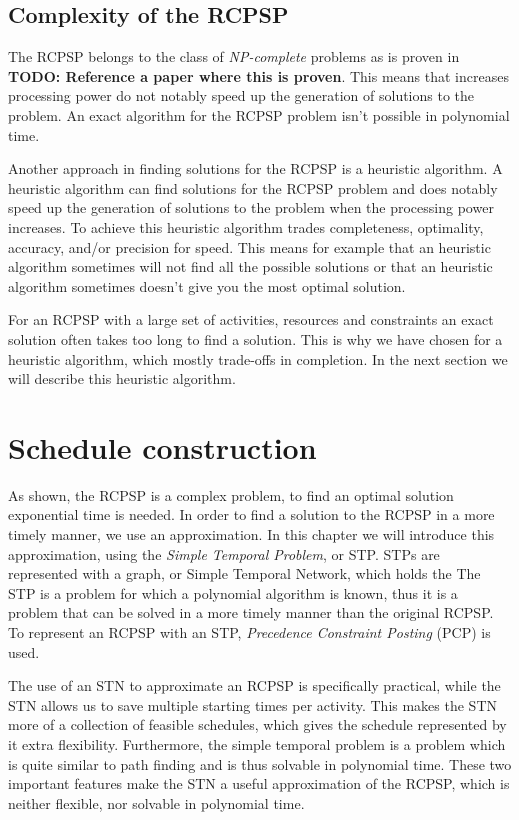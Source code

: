 \documentclass{article}
\theoremstyle{definition}
\newcommand{\TODO}[1]{{\color{red}\textbf{TODO: #1}}}
\begin{document}
\subsection{Complexity of the RCPSP}
\label{text:complex}
The RCPSP belongs to the class of \emph{NP-complete} problems as is proven in \TODO{Reference a paper where this is proven}.
This means that increases processing power do not notably speed up the generation of solutions to the problem.
An exact algorithm for the RCPSP problem isn't possible in polynomial time.

Another approach in finding solutions for the RCPSP is a heuristic algorithm.
A heuristic algorithm can find solutions for the RCPSP problem and does notably speed up the generation of solutions to the problem when the processing power increases.
To achieve this heuristic algorithm trades completeness, optimality, accuracy, and/or precision for speed.
This means for example that an heuristic algorithm sometimes will not find all the possible solutions or that an heuristic algorithm sometimes doesn't give you the most optimal solution.

For an RCPSP with a large set of activities, resources and constraints an exact solution often takes too long to find a solution.
This is why we have chosen for a heuristic algorithm, which mostly trade-offs in completion.
In the next section we will describe this heuristic algorithm.


\newpage


\section{Schedule construction}
\label{text:schedule}

As shown, the RCPSP is a complex problem, to find an optimal solution exponential time is needed.
In order to find a solution to the RCPSP in a more timely manner, we use an approximation.
In this chapter we will introduce this approximation, using the \emph{Simple Temporal Problem}, or STP.
STPs are represented with a graph, or Simple Temporal Network, which holds the 
The STP is a problem for which a polynomial algorithm is known, thus it is a problem that can be solved in a more timely manner than the original RCPSP.
To represent an RCPSP with an STP,  \emph{Precedence Constraint Posting} (PCP) is used.

The use of an STN to approximate an RCPSP is specifically practical, while the STN allows us to save multiple starting times per activity.
This makes the STN more of a collection of feasible schedules, which gives the schedule represented by it extra flexibility.
Furthermore, the simple temporal problem is a problem which is quite similar to path finding and is thus solvable in polynomial time.
These two important features make the STN a useful approximation of the RCPSP, which is neither flexible, nor solvable in polynomial time.
\end{document}

